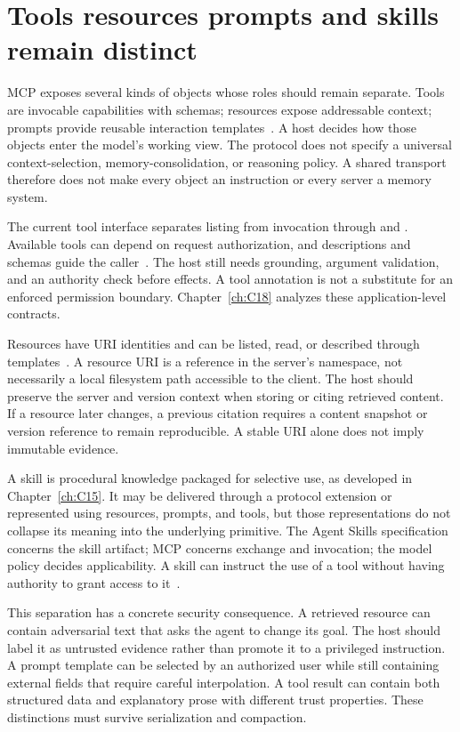 \section{Tools resources prompts and skills remain distinct}\label{sec:C19:primitives}
MCP exposes several kinds of objects whose roles should remain separate. Tools are invocable capabilities with schemas; resources expose addressable context; prompts provide reusable interaction templates~\cite{mcp2026spec}. A host decides how those objects enter the model's working view. The protocol does not specify a universal context-selection, memory-consolidation, or reasoning policy. A shared transport therefore does not make every object an instruction or every server a memory system.

The current tool interface separates listing from invocation through  and . Available tools can depend on request authorization, and descriptions and schemas guide the caller~\cite{mcp2026tools}. The host still needs grounding, argument validation, and an authority check before effects. A tool annotation is not a substitute for an enforced permission boundary. Chapter~\ref{ch:C18} analyzes these application-level contracts.

Resources have URI identities and can be listed, read, or described through templates~\cite{mcp2026resources}. A resource URI is a reference in the server's namespace, not necessarily a local filesystem path accessible to the client. The host should preserve the server and version context when storing or citing retrieved content. If a resource later changes, a previous citation requires a content snapshot or version reference to remain reproducible. A stable URI alone does not imply immutable evidence.

A skill is procedural knowledge packaged for selective use, as developed in Chapter~\ref{ch:C15}. It may be delivered through a protocol extension or represented using resources, prompts, and tools, but those representations do not collapse its meaning into the underlying primitive. The Agent Skills specification concerns the skill artifact; MCP concerns exchange and invocation; the model policy decides applicability. A skill can instruct the use of a tool without having authority to grant access to it~\cite{agentskills2026spec}.

This separation has a concrete security consequence. A retrieved resource can contain adversarial text that asks the agent to change its goal. The host should label it as untrusted evidence rather than promote it to a privileged instruction. A prompt template can be selected by an authorized user while still containing external fields that require careful interpolation. A tool result can contain both structured data and explanatory prose with different trust properties. These distinctions must survive serialization and compaction.

